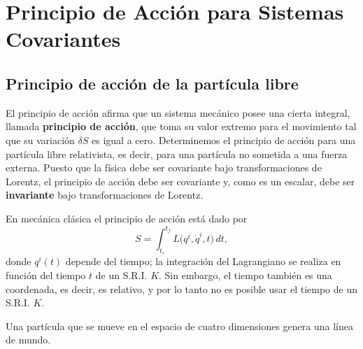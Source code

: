\chapter{Principio de Acción para Sistemas Covariantes}

\section{Principio de acción de la partícula libre}

El principio de acción afirma que un sistema mecánico posee una cierta
integral, llamada \textbf{principio de acción}, que toma su valor
extremo para el movimiento tal que su variación $\delta S$ es igual a
cero. Determinemos el principio de acción para una partícula libre
relativista, es decir, para una partícula no sometida a una fuerza
externa. Puesto que la física debe ser covariante bajo transformaciones
de Lorentz, el principio de acción debe ser covariante y, como es un
escalar, debe ser \textbf{invariante} bajo transformaciones de Lorentz.

En mecánica clásica el principio de acción está dado por
\[
S = \int_{t_i}^{t_f}L\big(q^i,\dot q^i,t\big)\,dt, \tag{1}
\]
donde $q^i(t)$ depende del tiempo; la integración del Lagrangiano se
realiza en función del tiempo $t$ de un S.R.I. $K$. Sin embargo, el
tiempo también es una coordenada, es decir, es relativo, y por lo tanto
no es posible usar el tiempo de un S.R.I. $K$.

Una partícula que se mueve en el espacio de cuatro dimensiones genera
una línea de mundo.

\begin{center}
\end{center}

